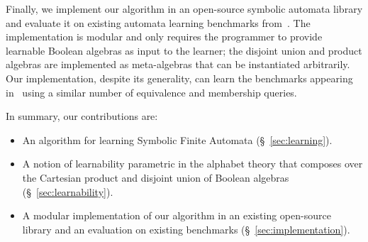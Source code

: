 Finally, we implement our algorithm in an open-source symbolic automata library
and evaluate it on existing automata learning benchmarks
from~\cite{mens15}.
The implementation is  modular and only requires the programmer to provide
learnable Boolean algebras as input to the learner; the disjoint union and product algebras
are implemented as meta-algebras that can be instantiated arbitrarily.
Our implementation, despite its generality,
can learn the benchmarks appearing in~\cite{mens15}
using a similar number of equivalence and membership queries.

In summary, our contributions are:
\begin{itemize}
\vspace{-1mm}
\item An algorithm for learning Symbolic Finite Automata (\S~\ref{sec:learning}).
\item A notion of learnability parametric in the alphabet theory that composes over the 
		 Cartesian product and disjoint union of Boolean algebras (\S~\ref{sec:learnability}).
\item A modular implementation of our algorithm in an existing open-source library and an evaluation on existing benchmarks (\S~\ref{sec:implementation}).
\end{itemize}
